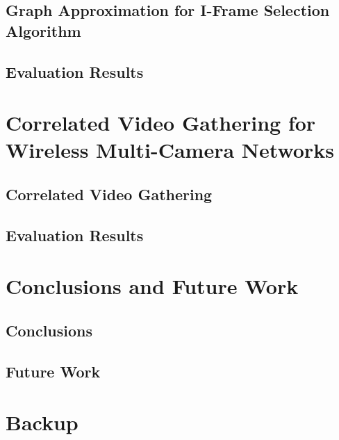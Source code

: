 \documentclass[slidestop,compress,mathserif]{beamer}
\begin{document}
\subsection{Graph Approximation for I-Frame Selection Algorithm}

\subsection{Evaluation Results}


\section{Correlated Video Gathering for Wireless Multi-Camera Networks}
%
\subsection{Correlated Video Gathering}

\subsection{Evaluation Results}


\section{Conclusions and Future Work}
\subsection{Conclusions}

\subsection{Future Work}

%
\section*{Backup}

\end{document}
